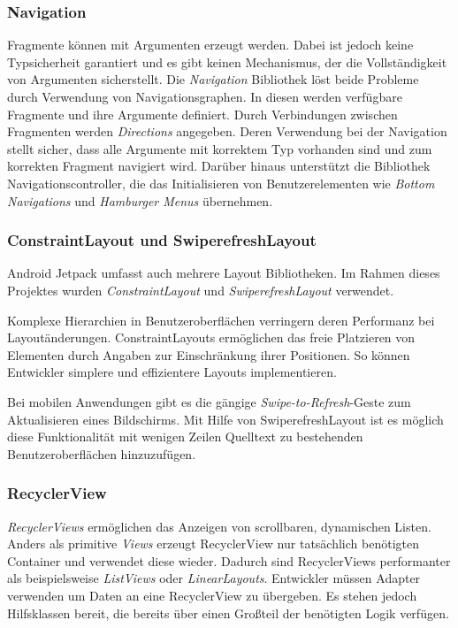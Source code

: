 \subsubsection{Navigation}
\label{subsubsec:app:jetpack:navigation}
Fragmente können mit Argumenten erzeugt werden.
Dabei ist jedoch keine Typsicherheit garantiert und es gibt keinen Mechanismus, der die Vollständigkeit von Argumenten sicherstellt.
Die \textit{Navigation} Bibliothek löst beide Probleme durch Verwendung von Navigationsgraphen.
In diesen werden verfügbare Fragmente und ihre Argumente definiert.
Durch Verbindungen zwischen Fragmenten werden \textit{Directions} angegeben.
Deren Verwendung bei der Navigation stellt sicher, dass alle Argumente mit korrektem Typ vorhanden sind und zum korrekten Fragment navigiert wird.
Darüber hinaus unterstützt die Bibliothek Navigationscontroller, die das Initialisieren von Benutzerelementen wie \textit{Bottom Navigations} und \textit{Hamburger Menus} übernehmen. 

\subsubsection{ConstraintLayout und SwiperefreshLayout}
\label{subsubsec:app:jetpack:layouts}
Android Jetpack umfasst auch mehrere Layout Bibliotheken.
Im Rahmen dieses Projektes wurden \textit{ConstraintLayout} und \textit{SwiperefreshLayout} verwendet.

Komplexe Hierarchien in Benutzeroberflächen verringern deren Performanz bei Layoutänderungen.
ConstraintLayouts ermöglichen das freie Platzieren von Elementen durch Angaben zur Einschränkung ihrer Positionen.
So können Entwickler simplere und effizientere Layouts implementieren.

Bei mobilen Anwendungen gibt es die gängige \textit{Swipe-to-Refresh}-Geste zum Aktualisieren eines Bildschirms.
Mit Hilfe von SwiperefreshLayout ist es möglich diese Funktionalität mit wenigen Zeilen Quelltext zu bestehenden Benutzeroberflächen hinzuzufügen.

\subsubsection{RecyclerView}
\label{subsubsec:app:jetpack:recyclerview}
\textit{RecyclerViews} ermöglichen das Anzeigen von scrollbaren, dynamischen Listen.
Anders als primitive \textit{Views} erzeugt RecyclerView nur tatsächlich benötigten Container und verwendet diese wieder.
Dadurch sind RecyclerViews performanter als beispielsweise \textit{ListViews} oder \textit{LinearLayouts}.
Entwickler müssen Adapter verwenden um Daten an eine RecyclerView zu übergeben.
Es stehen jedoch Hilfsklassen bereit, die bereits über einen Großteil der benötigten Logik verfügen.


